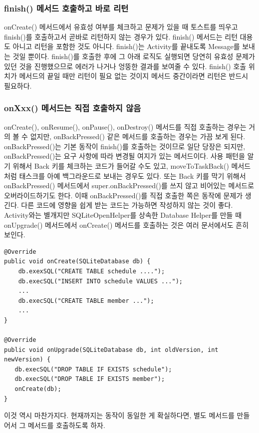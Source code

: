 \subsubsection{finish() 메서드 호출하고 바로 리턴}
onCreate() 메서드에서 유효성 여부를 체크하고 문제가 있을 때 토스트를 띄우고 finish()를 호출하고서 곧바로 리턴하지 않는 경우가 있다. finish() 메서드는 리턴 대용도 아니고 리턴을 포함한 것도 아니다. finish()는 Activity를 끝내도록 Message를 보내는 것일 뿐이다. finish()를 호출한 후에 그 아래 로직도 실행되면 당연히 유효성 문제가 있던 것을 진행했으므로 에러가 나거나 엉뚱한 결과를 보여줄 수 있다. finish() 호출 위치가 메서드의 끝일 때만 리턴이 필요 없는 것이지 메서드 중간이라면 리턴은 반드시 필요하다.

\subsubsection{onXxx() 메서드는 직접 호출하지 않음}
onCreate(), onResume(), onPause(), onDestroy() 메서드를 직접 호출하는 경우는 거의 볼 수 없지만, onBackPressed() 같은 메서드를 호출하는 경우는 가끔 보게 된다.
onBackPressed()는 기본 동작이 finish()를 호출하는 것이므로 일단 당장은 되지만, onBackPressed()는 요구 사항에 따라 변경될 여지가 있는 메서드이다.
사용 패턴을 알기 위해서 Back 키를 체크하는 코드가 들어갈 수도 있고, moveToTaskBack() 메서드처럼 태스크를 아예 백그라운드로 보내는 경우도 있다. 또는 Back 키를 막기 위해서 onBackPressed() 메서드에서 super.onBackPressed()를 쓰지 않고 비어있는 메서드로 오버라이드하기도 한다. 이때 onBackPressed()를 직접 호출한 쪽은 동작에 문제가 생긴다. 
다른 코드에 영향을 쉽게 받는 코드는 가능하면 작성하지 않는 것이 좋다.\\

Activity와는 별개지만 SQLiteOpenHelper를 상속한 Database Helper를 만들 때 onUpgrade() 메서드에서 onCreate() 메서드를 호출하는 것은 여러 문서에서도 흔히 보인다.
\begin{lstlisting}[frame=single]
@Override
public void onCreate(SQLiteDatabase db) {
    db.exexSQL("CREATE TABLE schedule ....");
    db.execSQL("INSERT INTO schedule VALUES ...");
    ...
    db.execSQL("CREATE TABLE member ...");
    ...
}

@Override
public void onUpgrade(SQLiteDatabase db, int oldVersion, int newVersion) {
   db.execSQL("DROP TABLE IF EXISTS schedule");
   db.execSQL("DROP TABLE IF EXISTS member");
   onCreate(db);
}
\end{lstlisting}
이것 역시 마찬가지다. 현재까지는 동작이 동일한 게 확실하다면, 별도 메서드를 만들어서 그 메서드를 호출하도록 하자.

